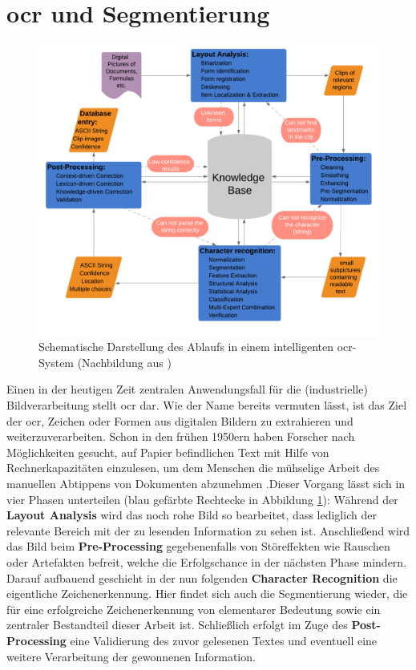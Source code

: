 	\section{\gls{ocr} und Segmentierung}
		\begin{figure}[H]
			\centering
			\includegraphics[width=\linewidth]{Ablauf-OCR_Cheriet-et-al.pdf}
			\caption[typisches \gls{ocr}-Ablaufschema]{Schematische Darstellung des 
				Ablaufs in einem intelligenten \gls{ocr}-System (Nachbildung aus 
				\cite[Seite 7]{cher-et-al-ocr})}
			\label{fig:ocr-system}
		\end{figure}
		
		Einen in der heutigen Zeit zentralen Anwendungsfall für die (industrielle) Bildverarbeitung stellt \gls{ocr} dar. Wie der Name bereits vermuten lässt, ist das Ziel der \gls{ocr}, Zeichen oder Formen aus digitalen Bildern zu extrahieren und weiterzuverarbeiten. Schon in den frühen 1950ern haben Forscher nach Möglichkeiten gesucht, auf Papier befindlichen Text mit Hilfe von Rechnerkapazitäten einzulesen, um dem Menschen die mühselige Arbeit des manuellen Abtippens von Dokumenten abzunehmen \cite{cher-et-al-ocr}.Dieser Vorgang lässt sich in vier Phasen unterteilen (blau gefärbte Rechtecke in Abbildung \ref{fig:ocr-system}): Während der \textbf{Layout Analysis} wird das noch rohe Bild so bearbeitet, dass lediglich der relevante Bereich mit der zu lesenden Information zu sehen ist. Anschließend wird das Bild beim \textbf{Pre-Processing} gegebenenfalls von Störeffekten wie Rauschen oder Artefakten befreit, welche die Erfolgschance in der nächsten Phase mindern. Darauf aufbauend geschieht in der nun folgenden \textbf{Character Recognition} die eigentliche Zeichenerkennung. Hier findet sich auch die Segmentierung wieder, die für eine erfolgreiche Zeichenerkennung von elementarer Bedeutung sowie ein zentraler Bestandteil dieser Arbeit ist. Schließlich erfolgt im Zuge des \textbf{Post-Processing} eine Validierung des zuvor gelesenen Textes und eventuell eine weitere Verarbeitung der gewonnenen Information. \\
		
